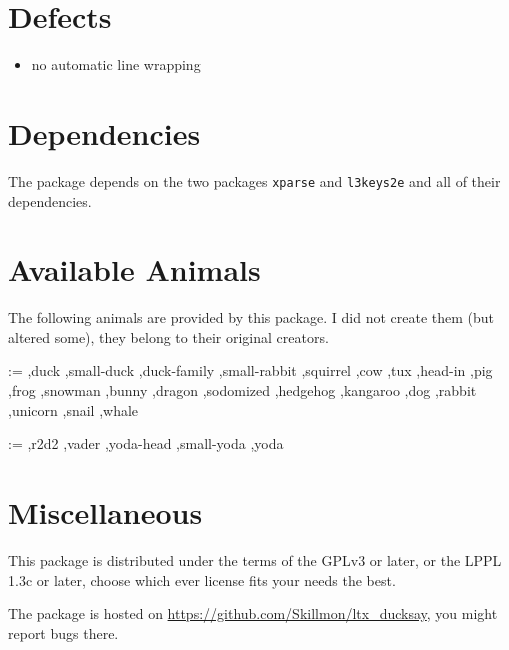 \documentclass[a4paper,10pt]{article}
\makeatletter
\newcommand*{\availableAnimal}[1]{\@for\cs:=#1\do{%
  \ifx\cs\@empty\else%
    \rlap{\expandafter\ducksay\expandafter[\cs]{\cs}}\hfill\mbox{}\\[1ex]%
  \fi%
}}
\makeatother
\begin{document}
\section{Defects}%
{\reversemarginpar{}}
\begin{itemize}
  \item no automatic line wrapping
\end{itemize}
\section{Dependencies}%
The package depends on the two packages \texttt{xparse} and \texttt{l3keys2e}
and all of their dependencies.
\section{Available Animals}\label{sec:animals}%
The following animals are provided by this package. I did not create them (but
altered some), they belong to their original creators.
\bgroup
\footnotesize
\begin{multicols}{2}
\availableAnimal{%
  ,duck%
  ,small-duck%
  ,duck-family%
  ,small-rabbit%
  ,squirrel%
  ,cow%
  ,tux%
  ,head-in%
  ,pig%
  ,frog%
  ,snowman%
  ,bunny%
  ,dragon%
  ,sodomized%
  ,hedgehog%
  ,kangaroo%
  ,dog%
  ,rabbit%
  ,unicorn%
  ,snail%
  ,whale%
}\end{multicols}\begin{multicols}{2}
\availableAnimal{%
  ,r2d2%
  ,vader%
  ,yoda-head%
  ,small-yoda%
  ,yoda%
}%
\end{multicols}
\egroup
\section{Miscellaneous}%
This package is distributed under the terms of the GPLv3 or later, or the LPPL
1.3c or later, choose which ever license fits your needs the best.

The package is hosted on \url{https://github.com/Skillmon/ltx_ducksay}, you
might report bugs there.
\clearpage
\thispagestyle{empty}
\bgroup
\Huge
\mbox{}\vfill
\centering
{}
\vfill
\hfill{}
\egroup
\end{document}
